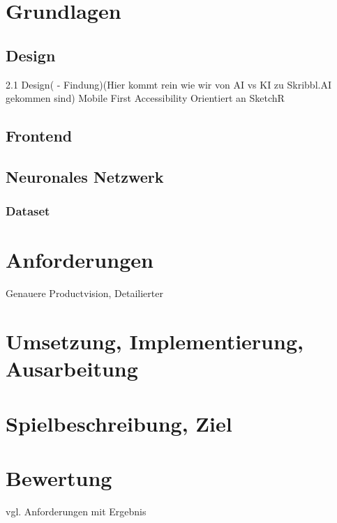 \documentclass[11pt]{article}
\begin{document}
\section{Grundlagen}
\subsection{Design}
2.1 Design( - Findung)(Hier kommt rein wie wir von AI vs KI zu Skribbl.AI gekommen sind)
Mobile First
Accessibility
Orientiert an SketchR
\subsection{Frontend}
\subsection{Neuronales Netzwerk}
\subsubsection{Dataset}
\section{Anforderungen}
Genauere Productvision, Detailierter
\section{Umsetzung, Implementierung, Ausarbeitung}
\section{Spielbeschreibung, Ziel}
\section{Bewertung}
vgl. Anforderungen mit Ergebnis

\printbibliography
\end{document}
